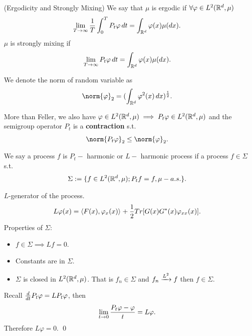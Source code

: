 \begin{dfn}{(Ergodicity and Strongly Mixing)}
We say that $\mu$ is ergodic if $\forall \varphi \in L^{2}(\mathbb{R}^d,\mu)$
\begin{equation*}
    \lim\limits_{T\rightarrow \infty} \frac{1}{T} \int_0^T P_t \varphi \mathop{}\!d t = \int_{\mathbb{R}^d} \varphi(x) \mu(\mathop{}\!d x).
\end{equation*}
$\mu$ is strongly mixing if 
\begin{equation*}
    \lim\limits_{T\rightarrow \infty} P_t \varphi \mathop{}\!d t = \int_{\mathbb{R}^d} \varphi(x) \mu(\mathop{}\!d x).
\end{equation*}
\end{dfn}
We denote the norm of random variable as
\begin{equation*}
    \norm{\varphi}_2 = (\int_{\R^d} \varphi^2(x) \diff x)^{\frac{1}{2}}.
\end{equation*}

\begin{thm}
More than  Feller, we also have $\varphi \in L^{2}(\mathbb{R}^d,\mu) \implies P_t\varphi \in L^{2}(\mathbb{R}^d,\mu) $ and the semigroup operator $P_t$ is a \textbf{contraction} s.t.
\begin{equation*}
    \norm{P_t\varphi}_2 \leq \norm{\varphi}_2.
\end{equation*}
\end{thm}

\begin{dfn}
We say a process $f$ is $P_t-$ harmonic or $L-$ harmonic process if a process $f\in \Sigma$ s.t.
\begin{equation*}
    \Sigma := \{f\in L^{2}(\mathbb{R}^d, \mu); P_t f = f, \mu-a.s.\}.
\end{equation*}
\end{dfn}
$L$-generator of the process.
\begin{equation*}
    L\varphi(x) = \langle{F(x), \varphi_x(x)} \rangle_{} + \frac{1}{2} Tr[G(x) G^*(x) \varphi_{xx}(x)].
\end{equation*}
Properties of $\Sigma$:
\begin{itemize}
    \item $f\in \Sigma \implies L f = 0$.
    \item Constants are in $\Sigma$.
    \item $\Sigma$ is closed in $L^{2}(\mathbb{R}^d,\mu)$. That is $f_n \in \Sigma$ and $f_n \xrightarrow{L^{2}} f$ then $f\in \Sigma$.
\end{itemize}
\pf Recall $\frac{\mathop{}\!d}{\mathop{}\!d t} P_t \varphi = L P_t \varphi$, then 
\begin{equation*}
    \lim\limits_{t\rightarrow 0} \frac{P_t \varphi - \varphi}{t} = L\varphi.
\end{equation*}Therefore $L \varphi = 0$. 
\qed

